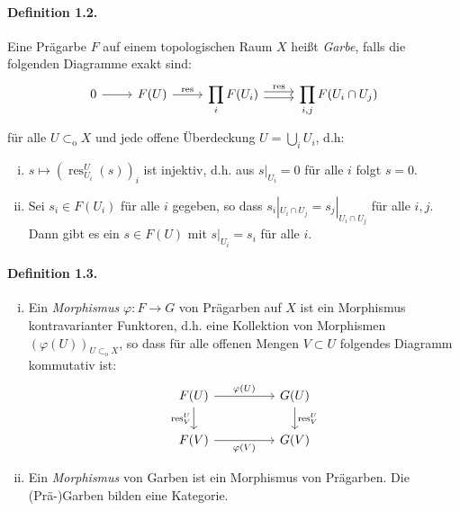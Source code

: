\paragraph{Definition 1.2.}\label{1.2} Eine Prägarbe $F$ auf einem topologischen Raum $X$ heißt \textit{Garbe}, falls die folgenden Diagramme exakt sind:
\[\begin{tikzcd}
0\ar[r] & F(U)\ar[r, "\operatorname{res}"] & \displaystyle\prod_i F(U_i)\ar[r, "\operatorname{res}", shift left] \ar[r, shift right] & \displaystyle\prod_{i,j}F(U_i\cap U_j)
\end{tikzcd} \]
für alle $U\subset_\text{o}X$ und jede offene Überdeckung $U=\bigcup_i U_i$, d.h:
\begin{enumerate}[(i)]
\item $s\mapsto (\operatorname{res}^U_{U_i}(s))_i$ ist injektiv, d.h. aus $s|_{U_i}=0$ für alle $i$ folgt $s=0$.
\item Sei $s_i\in F(U_i)$ für alle $i$ gegeben, so dass $s_i|_{U_i\cap U_j}=s_j|_{U_i\cap U_j}$ für alle $i,j$. Dann gibt es ein $s\in F(U)$ mit $s|_{U_i}=s_i$ für alle $i$.
\end{enumerate}

\paragraph{Definition 1.3.}\label{1.3} \begin{enumerate}[(i)]
\item Ein \textit{Morphismus} $\varphi:F\to G$ von Prägarben auf $X$ ist ein Morphismus kontravarianter Funktoren, d.h. eine Kollektion von Morphismen $(\varphi(U))_{U\subset_\text{o}X}$, so dass für alle offenen Mengen $V\subset U$ folgendes Diagramm kommutativ ist:
\[\begin{tikzcd}
F(U)\ar[rr, "\varphi(U)"]\ar[d, "\operatorname{res}^U_V"'] && G(U)\ar[d, "\operatorname{res}^U_V"]\\
F(V)\ar[rr, "\varphi(V)"'] && G(V)
\end{tikzcd} \]
\item Ein \textit{Morphismus} von Garben ist ein Morphismus von Prägarben. Die (Prä-)Garben bilden eine Kategorie.
\end{enumerate}

